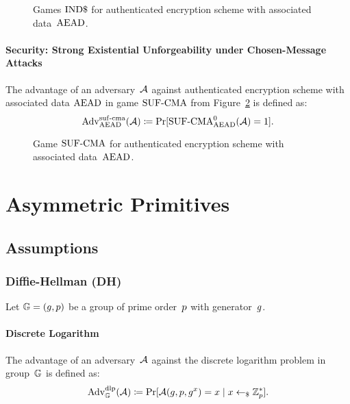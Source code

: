 \documentclass[a4paper,orivec]{llncs}
\begin{document}
\begin{figure}[!ht]
    \centering
    \nicoresetlinenr%
    \fbox{%
        \scalebox{\codescalefactor}{%
        }%
    }
    \caption{%
        Games ${\mathrm{IND}\$}$ for authenticated encryption scheme with associated data~$\mathrm{AEAD}$.
    }
    \label{fig:sym:aenc:indd}
\end{figure}

\paragraph{Security: Strong Existential Unforgeability under Chosen-Message Attacks}
The advantage of an adversary~$\mathcal{A}$ against authenticated encryption scheme with associated data $\mathrm{AEAD}$ in game ${\mathrm{SUF}\text{-}\mathrm{CMA}}$ from Figure~\ref{fig:sym:aenc:suf} is defined as:
\[
\mathrm{Adv}_{\mathrm{AEAD}}^{\mathrm{suf}\text{-}\mathrm{cma}}(\mathcal{A})\coloneqq\Pr[{\mathrm{SUF}\text{-}\mathrm{CMA}}_{\mathrm{AEAD}}^0(\mathcal{A})=1]\text{.}
\]

\begin{figure}[!ht]
    \centering
    \nicoresetlinenr%
    \fbox{%
        \scalebox{\codescalefactor}{%
        }%
    }
    \caption{%
        Game ${\mathrm{SUF}\text{-}\mathrm{CMA}}$ for authenticated encryption scheme with associated data~$\mathrm{AEAD}$.
    }
    \label{fig:sym:aenc:suf}
\end{figure}




\section{Asymmetric Primitives}
\label{sec:asym}

\subsection{Assumptions}
\label{sec:asym:assumptions}

\subsubsection{Diffie-Hellman (DH)}
\label{sec:asym:assumptions:dh}
Let $\mathbb{G}=(g,p)$ be a group of prime order~$p$ with generator~$g$.

\paragraph{Discrete Logarithm}
The advantage of an adversary~$\mathcal{A}$ against the discrete logarithm problem in group~$\mathbb{G}$ is defined as:
\[
\mathrm{Adv}_{\mathbb{G}}^{\mathrm{dlp}}(\mathcal{A})\coloneqq\Pr[\mathcal{A}(g,p,g^x)=x\mid x\gets_\$\mathbb{Z}_p^*]\text{.}
\]
\end{document}

